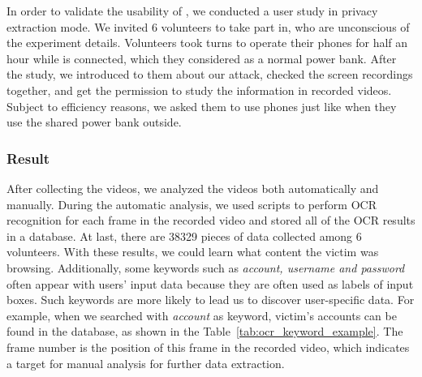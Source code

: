 In order to validate the usability of \tool, we conducted a user study in privacy extraction mode. 
We invited 6 volunteers to take part in, who are unconscious of the experiment details.
Volunteers took turns to operate their phones for half an hour while \tool is connected, which they considered as a normal power bank.
After the study, we introduced to them about our attack, checked the screen recordings together, and get the permission to study the information in recorded videos.
Subject to efficiency reasons, we asked them to use phones just like when they use the shared power bank outside.


\subsubsection{Result}

After collecting the videos, we analyzed the videos both automatically and manually. 
During the automatic analysis, we used scripts to perform OCR recognition for each frame in the recorded video and stored all of the OCR results in a database.
At last, there are 38329 pieces of data collected among 6 volunteers.
With these results, we could learn what content the victim was browsing.
Additionally, some keywords such as \textit{account, username and password} often appear with users' input data because they are often used as labels of input boxes.
Such keywords are more likely to lead us to discover user-specific data.
For example, when we searched with \textit{account} as keyword, victim's accounts can be found in the database, as shown in the Table~\ref{tab:ocr_keyword_example}.
The frame number is the position of this frame in the recorded video, which indicates a target for manual analysis for further data extraction.

